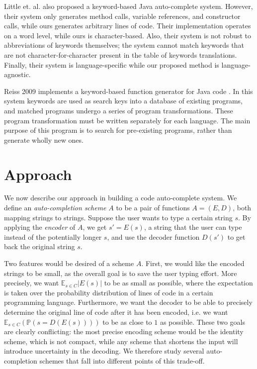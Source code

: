 \documentclass{article}
\begin{document}
Little et. al. also proposed a keyword-based Java auto-complete system\cite{Little2009}. However, their system only generates method calls, variable references, and constructor calls, while ours generates arbitrary lines of code. Their implementation operates on a word level, while ours is character-based. Also, their system is not robust to abbreviations of keywords themselves; the system cannot match keywords that are not character-for-character present in the table of keywords translations. Finally, their system is language-specific while our proposed method is language-agnostic.

Reiss 2009 implements a keyword-based function generator for Java code \cite{Reiss}. In this system keywords are used as search keys into a database of existing programs, and matched programs undergo a series of program transformations. These program transformation must be written separately for each language. The main purpose of this program is to search for pre-existing programs, rather than generate wholly new ones.





\section{Approach}

We now describe our approach in building a code auto-complete system.
We define an \emph{auto-completion scheme}
$A$ to be a pair of functions $A = (E, D)$, both mapping strings to strings. Suppose the user wants to
type a certain string $s$. By applying the \emph{encoder} of $A$, we get $s' = E(s)$, a string that
the user can type instead of the potentially longer $s$, and use the decoder function $D(s')$ to get
back the original string $s$.

Two features would be desired of a scheme $A$.
First, we would like the encoded strings to be small, as the overall goal is to save the user typing
effort. More precisely, we want $\mathbb{E}_{s \in C} |E(s)|$ to be as small as possible, where
the expectation is taken over the probability distribution of lines of code in a certain
programming language.
Furthermore, we want the decoder to be able to precisely determine the original line of code
after it has been encoded, i.e. we want $\mathbb{E}_{s \in C} \left(\mathbb{P}(s = D(E(s))) \right)$
to be as close to $1$ as possible. These two goals are clearly conflicting: the most precise encoding
scheme would be the identity scheme, which is not compact, while any scheme that shortens the input
will introduce uncertainty in the decoding. We therefore study several auto-completion schemes that
fall into different points of this trade-off.
\end{document}

